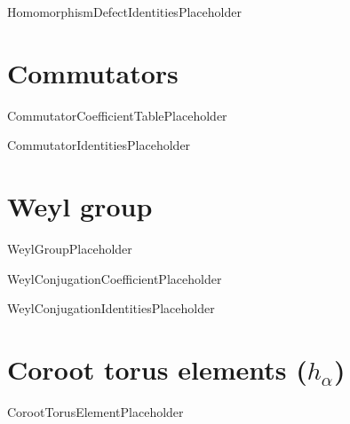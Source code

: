 \documentclass[11pt]{article}
\theoremstyle{definition}
\begin{document}
HomomorphismDefectIdentitiesPlaceholder

\section{Commutators}

CommutatorCoefficientTablePlaceholder

CommutatorIdentitiesPlaceholder

\section{Weyl group}

WeylGroupPlaceholder

WeylConjugationCoefficientPlaceholder

WeylConjugationIdentitiesPlaceholder

\section{Coroot torus elements ($h_\alpha$)}

CorootTorusElementPlaceholder
\end{document}
